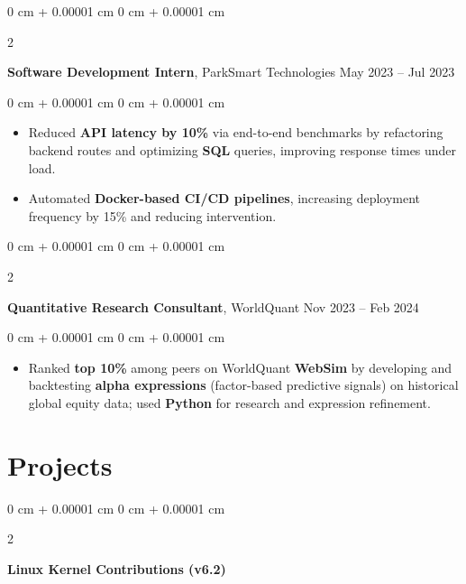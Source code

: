 \documentclass[10pt, letterpaper]{article}
\newenvironment{highlightsjustified}{
    \begin{itemize}[
        topsep=0.10 cm,
        parsep=0.10 cm,
        partopsep=0pt,
        itemsep=0pt,
        leftmargin=0 cm + 10pt
    ]
    \justifying
}{
    \end{itemize}
} %
\newenvironment{onecolentry}{
    \begin{adjustwidth}{
        0 cm + 0.00001 cm
    }{
        0 cm + 0.00001 cm
    }
}{
    \end{adjustwidth}
} %
\newenvironment{twocolentry}[2][]{
    \onecolentry
    \def\secondColumn{#2}
    \setcolumnwidth{\fill, 4.5 cm}
    \begin{paracol}{2}
}{
    \switchcolumn \raggedleft \secondColumn
    \end{paracol}
    \endonecolentry
} %
\begin{document}
        \vspace{0.2 cm}

        \begin{twocolentry}{
            May 2023 – Jul 2023
        }
            \textbf{Software Development Intern}, ParkSmart Technologies\end{twocolentry}

        \vspace{0.10 cm}
        \begin{onecolentry}
            \begin{highlightsjustified}
                \item Reduced \textbf{API latency by 10\%} via end-to-end benchmarks by refactoring backend routes and optimizing \textbf{SQL} queries, improving response times under load.
                \item Automated \textbf{Docker-based CI/CD pipelines}, increasing deployment frequency by 15\% and reducing intervention.
            \end{highlightsjustified}
        \end{onecolentry}

        \vspace{0.2 cm}

        \begin{twocolentry}{
            Nov 2023 – Feb 2024
        }
            \textbf{Quantitative Research Consultant}, WorldQuant\end{twocolentry}

        \vspace{0.10 cm}
        \begin{onecolentry}
            \begin{highlightsjustified}
                \item Ranked \textbf{top 10\%} among peers on WorldQuant \textbf{WebSim} by developing and backtesting \textbf{alpha expressions} (factor-based predictive signals) on historical global equity data; used \textbf{Python} for research and expression refinement.
            \end{highlightsjustified}
        \end{onecolentry}


    
    \section{Projects}



        
        \begin{twocolentry}{
     
        }
            \textbf{Linux Kernel Contributions (v6.2)}
        
        \end{twocolentry}
\end{document}
